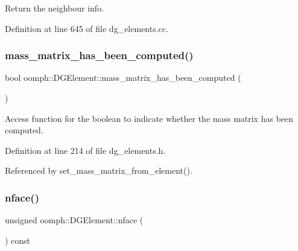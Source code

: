 Return the neighbour info. 



Definition at line 645 of file dg\+\_\+elements.\+cc.

\mbox{\label{classoomph_1_1DGElement_a5d30dc3eb67c43f9f01db5f1386fc5f8}} 
\subsubsection{\texorpdfstring{mass\+\_\+matrix\+\_\+has\+\_\+been\+\_\+computed()}{mass\_matrix\_has\_been\_computed()}}
{\footnotesize\ttfamily bool oomph\+::\+D\+G\+Element\+::mass\+\_\+matrix\+\_\+has\+\_\+been\+\_\+computed (\begin{DoxyParamCaption}{ }\end{DoxyParamCaption})\hspace{0.3cm}{\ttfamily [inline]}}



Access function for the boolean to indicate whether the mass matrix has been computed. 



Definition at line 214 of file dg\+\_\+elements.\+h.



Referenced by set\+\_\+mass\+\_\+matrix\+\_\+from\+\_\+element().

\mbox{\label{classoomph_1_1DGElement_a76598661987374a484d75d626f9bc13b}} 
\subsubsection{\texorpdfstring{nface()}{nface()}}
{\footnotesize\ttfamily unsigned oomph\+::\+D\+G\+Element\+::nface (\begin{DoxyParamCaption}{ }\end{DoxyParamCaption}) const\hspace{0.3cm}{\ttfamily [inline]}}



